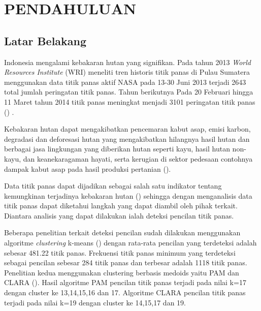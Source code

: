 \section*{PENDAHULUAN} %
\subsection*{Latar Belakang}
Indonesia mengalami kebakaran hutan yang signifikan. Pada tahun 2013 \textit{World Resources Institute} (WRI)  meneliti tren historis titik panas di Pulau Sumatera menggunakan data titik panas aktif NASA pada 13-30 Juni 2013 terjadi 2643 total jumlah peringatan titik panas. Tahun berikutnya Pada  20 Februari hingga 11 Maret tahun 2014 titik panas meningkat menjadi 3101 peringatan titik panas (\cite{Sizer2014}) . 

Kebakaran hutan dapat mengakibatkan pencemaran kabut asap, emisi karbon, degradasi dan deforesasi hutan yang mengakibatkan hilangnya hasil hutan dan berbagai jasa lingkungan yang diberikan hutan seperti kayu, hasil hutan non- kayu, dan keanekaragaman hayati, serta kerugian di sektor pedesaan contohnya dampak kabut asap pada hasil produksi pertanian  (\cite{Tacconi2003}).

Data titik panas dapat dijadikan sebagai salah satu indikator tentang kemungkinan terjadinya kebakaran hutan (\cite*{Adinugroho2005})  sehingga dengan menganalisis data titik panas dapat diketahui langkah yang dapat diambil oleh pihak terkait. Diantara analisis yang dapat dilakukan ialah deteksi pencilan titik panas. 

Beberapa penelitian terkait deteksi pencilan sudah dilakukan menggunakan algoritme \textit{clustering} k-means (\cite{Baehaki2014}) dengan rata-rata pencilan yang terdeteksi adalah sebesar 481.22 titik panas. Frekuensi titik panas minimum yang terdeteksi sebagai pencilan sebesar 284 titik panas dan terbesar adalah 1118 titik panas. Penelitian kedua menggunakan clustering berbasis medoids yaitu PAM dan CLARA (\cite{Cahyadarena2014}). Hasil algoritme PAM pencilan titik panas terjadi pada nilai k=17 dengan cluster ke 13,14,15,16 dan 17. Algoritme CLARA pencilan titik panas terjadi pada nilai k=19 dengan cluster ke 14,15,17 dan 19. 

